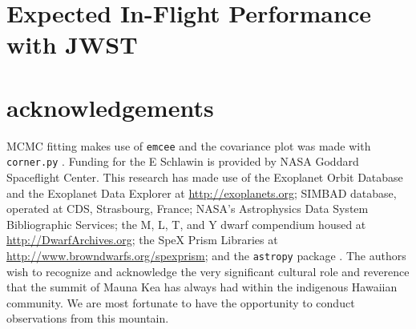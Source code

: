 \documentclass{aastex62}
\begin{document}
{%
\acknowledgments

\clearpage
\section{Expected In-Flight Performance with JWST}

\section*{acknowledgements}
MCMC fitting makes use of \texttt{emcee} \citep{foreman-mackey2013emcee} and the covariance plot was made with \texttt{corner.py} \citep{foremanCorner}.
Funding for the E Schlawin is provided by NASA Goddard Spaceflight Center.
This research has made
use of the Exoplanet Orbit Database and the Exoplanet Data Explorer at \url{http://exoplanets.org}; SIMBAD database, operated at CDS, Strasbourg,
France; NASA's Astrophysics Data System Bibliographic
Services; the M, L, T, and Y dwarf compendium
housed at \url{http://DwarfArchives.org}; the SpeX Prism
Libraries at \url{http://www.browndwarfs.org/spexprism}; and the \texttt{astropy} package \citep{astropy2013}. 
The authors wish to recognize and acknowledge the very significant cultural role and reverence that the summit of Mauna Kea has always had within the indigenous Hawaiian community. We are most fortunate to have the opportunity to conduct observations from this mountain.

%

\vspace{5mm}


}
\end{document}
